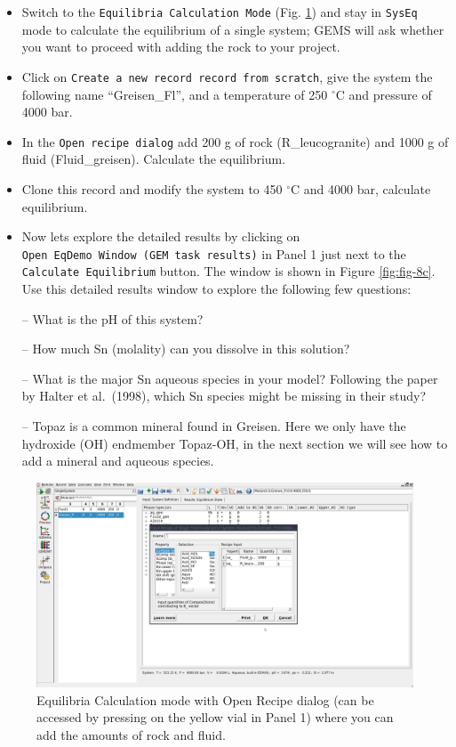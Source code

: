 \documentclass[
]{book}
\begin{document}
\begin{itemize}
\item
  Switch to the \texttt{Equilibria\ Calculation\ Mode} (Fig. \ref{fig:fig-7c}) and stay in \texttt{SysEq} mode to calculate the equilibrium of a single system; GEMS will ask whether you want to proceed with adding the rock to your project.
\item
  Click on \texttt{Create\ a\ new\ record\ record\ from\ scratch}, give the system the following name ``Greisen\_Fl'', and a temperature of 250 \(^\circ\)C and pressure of 4000 bar.
\item
  In the \texttt{Open\ recipe\ dialog} add 200 g of rock (R\_leucogranite) and 1000 g of fluid (Fluid\_greisen). Calculate the equilibrium.
\item
  Clone this record and modify the system to 450 \(^\circ\)C and 4000 bar, calculate equilibrium.
\item
  Now lets explore the detailed results by clicking on \texttt{Open\ EqDemo\ Window\ (GEM\ task\ results)} in Panel 1 just next to the \texttt{Calculate\ Equilibrium} button. The window is shown in Figure \ref{fig:fig-8c}. Use this detailed results window to explore the following few questions:

  -- What is the pH of this system?

  -- How much Sn (molality) can you dissolve in this solution?

  -- What is the major Sn aqueous species in your model? Following the paper by Halter et al.~(1998), which Sn species might be missing in their study?

  -- Topaz is a common mineral found in Greisen. Here we only have the hydroxide (OH) endmember Topaz-OH, in the next section we will see how to add a mineral and aqueous species.
\end{itemize}

\begin{figure}
\includegraphics[width=1\linewidth]{figures/module3/fig-7} \caption{Equilibria Calculation mode with Open Recipe dialog (can be accessed by pressing on the yellow vial in Panel 1) where you can add the amounts of rock and fluid.}\label{fig:fig-7c}
\end{figure}
\end{document}
